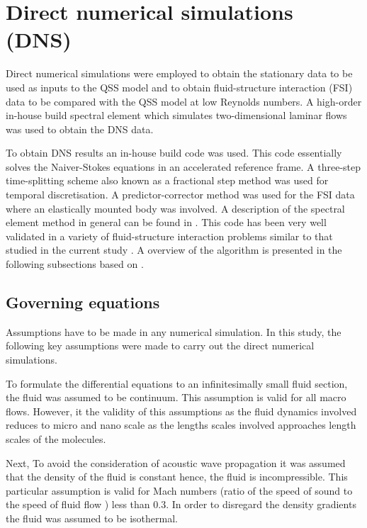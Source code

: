 \section{Direct numerical simulations (DNS)}

Direct numerical simulations were employed to obtain the stationary data to be used as inputs to the QSS model and to obtain  fluid-structure interaction (FSI) data to be compared with the QSS model at low Reynolds numbers. A high-order in-house build spectral element which simulates two-dimensional laminar flows was used to obtain the DNS data.


To obtain DNS results an in-house build code was used. This code essentially solves the Naiver-Stokes equations in an accelerated reference frame. A three-step time-splitting scheme also known as a fractional step method was used for temporal discretisation. A predictor-corrector method was used for the FSI data where an elastically mounted body was involved. A description of the spectral element method in general can be found in \citet{karniadakis2005}. This code has been very well validated in a variety of fluid-structure interaction problems similar to that studied in the current study \citep{Leontini2007a,Griffith2011,Leontini2011,Leontini2013}. A overview of the algorithm is presented in the following subsections based on \citet{Leontini:thesis}. 

\subsection{Governing equations}
 
 Assumptions have to be made in any numerical simulation. In this study, the following key assumptions were made to carry out the direct numerical simulations. 
 
 To formulate the differential equations to an infinitesimally small fluid section, the fluid was assumed to be continuum. This assumption is valid for all macro flows. However, it the validity of this assumptions as the fluid dynamics involved reduces to micro and nano scale as the lengths scales involved approaches length scales of the molecules.
 
 Next, To avoid the consideration of acoustic wave propagation it was assumed that the density of the fluid is constant hence, the fluid is incompressible. This particular assumption is valid for Mach numbers (ratio of the speed of sound to the speed of fluid flow ) less than 0.3. In order to disregard the density gradients the fluid was assumed to be isothermal. 
 
